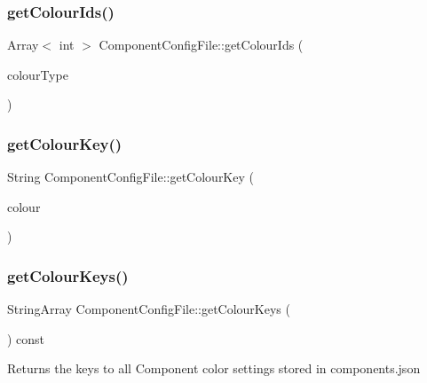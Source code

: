 \subsubsection{\texorpdfstring{get\+Colour\+Ids()}{getColourIds()}}
{\footnotesize\ttfamily Array$<$ int $>$ Component\+Config\+File\+::get\+Colour\+Ids (\begin{DoxyParamCaption}\item[{\mbox{\hyperlink{classComponentConfigFile_a9bf86058d7f64d6ba94770c3dbf3cad8}{Component\+Config\+File\+::\+Default\+Colour}}}]{colour\+Type }\end{DoxyParamCaption})}

\mbox{\label{classComponentConfigFile_a96867166b573ab6d14d343d45ee7d51e}} 
\subsubsection{\texorpdfstring{get\+Colour\+Key()}{getColourKey()}}
{\footnotesize\ttfamily String Component\+Config\+File\+::get\+Colour\+Key (\begin{DoxyParamCaption}\item[{\mbox{\hyperlink{classComponentConfigFile_a9bf86058d7f64d6ba94770c3dbf3cad8}{Default\+Colour}}}]{colour }\end{DoxyParamCaption})}

\mbox{\label{classComponentConfigFile_af3ca8de8ed548f662eaf07c59cd4abe9}} 
\subsubsection{\texorpdfstring{get\+Colour\+Keys()}{getColourKeys()}}
{\footnotesize\ttfamily String\+Array Component\+Config\+File\+::get\+Colour\+Keys (\begin{DoxyParamCaption}{ }\end{DoxyParamCaption}) const}

\begin{DoxyReturn}{Returns}
the keys to all Component color settings stored in components.\+json 
\end{DoxyReturn}
\mbox{\label{classComponentConfigFile_a4a82c4e5eedd8ee0128e4e4074a84f8a}} 
